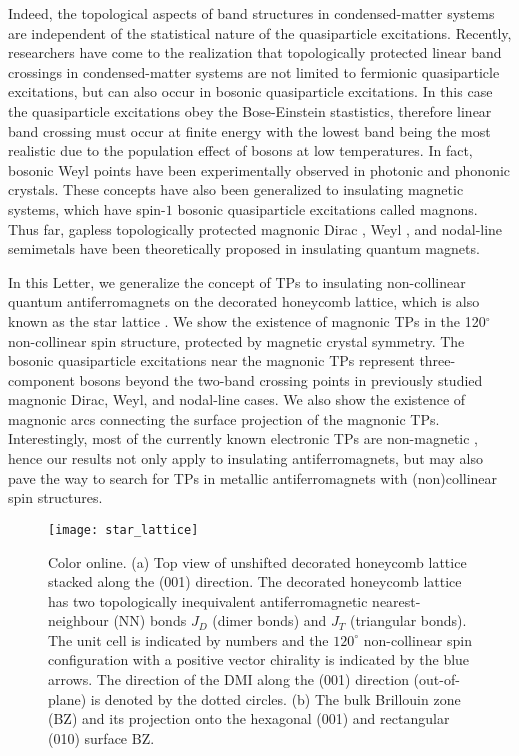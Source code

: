 \documentclass[doublecol]{epl2}
\begin{document}
Indeed, the topological aspects of band structures in condensed-matter systems  are independent of the statistical nature of the quasiparticle excitations.  Recently, researchers have come to the realization that topologically protected linear band crossings in condensed-matter systems are not limited to fermionic quasiparticle excitations, but can also occur in bosonic quasiparticle excitations. In this case the quasiparticle excitations obey the Bose-Einstein stastistics, therefore linear band crossing must occur at finite energy with the lowest band being the most realistic due to the population effect of bosons at low temperatures. In fact, bosonic Weyl points have been experimentally observed in photonic \cite{lu} and phononic \cite{fee} crystals. These concepts have also been generalized to insulating magnetic systems, which have spin-$1$ bosonic quasiparticle excitations called magnons. Thus far, gapless topologically protected magnonic Dirac \cite{md1,md2,md3,md4}, Weyl \cite{mw1, mw2, mw3, mw4, mw5, mw6, mw7, mw8}, and nodal-line \cite{nw0,nw1} semimetals have been theoretically proposed in insulating quantum magnets.  

In this Letter, we generalize the concept of  TPs to insulating  non-collinear  quantum antiferromagnets on the decorated honeycomb lattice, which is also known as the star lattice \cite{zheng, rich}. We show the existence of magnonic TPs in the  120$^\circ$ non-collinear spin structure, protected by magnetic crystal symmetry. The bosonic quasiparticle excitations near the magnonic TPs represent three-component bosons beyond the two-band crossing points in previously studied magnonic  Dirac, Weyl, and nodal-line cases. We also show the existence of magnonic  arcs connecting the surface projection of the magnonic TPs.  Interestingly, most of  the currently known  electronic TPs are non-magnetic \cite{tp0,tp1,tp2,tp3,tp4,tp5,tp6, tp6a, tp6b, tp7,tp8, tp8a}, hence our results not only apply to insulating antiferromagnets, but may also  pave the way to search for TPs in metallic  antiferromagnets with (non)collinear spin structures.




 \begin{figure*}
\centering
\texttt{[image: star\_lattice]}
\caption{Color online. (a) Top view of  unshifted decorated honeycomb lattice stacked along the (001) direction. The decorated honeycomb lattice has two topologically inequivalent antiferromagnetic nearest-neighbour (NN) bonds $J_D$ (dimer  bonds) and $J_T$ (triangular bonds).  The unit cell is indicated by numbers and the $120^\circ$ non-collinear spin configuration with a positive vector chirality is indicated  by the blue arrows. The direction of the DMI along the (001) direction (out-of-plane)  is denoted by the dotted circles. (b) The bulk Brillouin zone (BZ)  and  its projection onto the hexagonal (001) and rectangular (010) surface BZ. }
\label{lattice}
\end{figure*}
   
\end{document}
